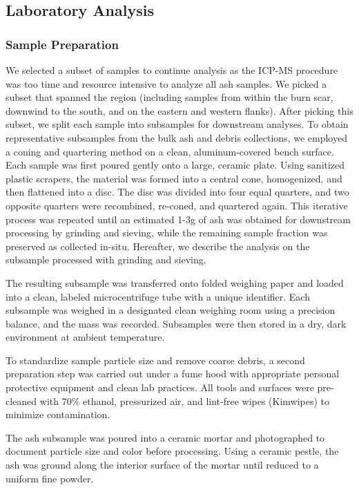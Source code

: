 \documentclass[12pt,letterpaper]{article}
\begin{document}
\subsection{Laboratory Analysis}

\subsubsection{Sample Preparation}
We selected a subset of samples to continue analysis as the ICP-MS procedure was too time and resource intensive to analyze all ash samples. We picked a subset that spanned the region (including samples from within the burn scar, downwind to the south, and on the eastern and western flanks). After picking this subset, we split each sample into subsamples for downstream analyses. To obtain representative subsamples from the bulk ash and debris collections, we employed a coning and quartering method on a clean, aluminum-covered bench surface. Each sample was first poured gently onto a large, ceramic plate. Using sanitized plastic scrapers, the material was formed into a central cone, homogenized, and then flattened into a disc. The disc was divided into four equal quarters, and two opposite quarters were recombined, re-coned, and quartered again. This iterative process was repeated until an estimated 1-3g of ash was obtained for downstream processing by grinding and sieving, while the remaining sample fraction was preserved as collected in-situ. Hereafter, we describe the analysis on the subsample processed with grinding and sieving. 

The resulting subsample was transferred onto folded weighing paper and loaded into a clean, labeled microcentrifuge tube with a unique identifier. Each subsample was weighed in a designated clean weighing room using a precision balance, and the mass was recorded. Subsamples were then stored in a dry, dark environment at ambient temperature. 

To standardize sample particle size and remove coarse debris, a second preparation step was carried out under a fume hood with appropriate personal protective equipment and clean lab practices. All tools and surfaces were pre-cleaned with 70\% ethanol, pressurized air, and lint-free wipes (Kimwipes) to minimize contamination. 

The ash subsample was poured into a ceramic mortar and photographed to document particle size and color before processing. Using a ceramic pestle, the ash was ground along the interior surface of the mortar until reduced to a uniform fine powder. 
\end{document}
